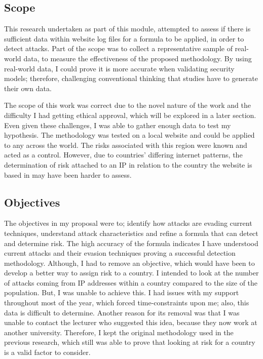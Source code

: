 \subsection{Scope}

This research undertaken as part of this module, attempted to assess if there is sufficient data within website log files for a formula to be applied, in order to detect attacks. Part of the scope was to collect a representative sample of real-world data, to measure the effectiveness of the proposed methodology. By using real-world data, I could prove it is more accurate when validating security models; therefore, challenging conventional thinking that studies have to generate their own data.

The scope of this work was correct due to the novel nature of the work and the difficulty I had getting ethical approval, which will be explored in a later section. Even given these challenges, I was able to gather enough data to test my hypothesis. The methodology was tested on a local website and could be applied to any across the world. The risks associated with this region were known and acted as a control. However, due to countries' differing internet patterns, the determination of risk attached to an IP in relation to the country the website is based in may have been harder to assess.



\subsection{Objectives}

The objectives in my proposal were to; identify how attacks are evading current techniques, understand attack characteristics and refine a formula that can detect and determine risk. The high accuracy of the formula indicates I have understood current attacks and their evasion techniques proving a successful detection methodology. Although, I had to remove an objective, which would have been to develop a better way to assign risk to a country. I intended to look at the number of attacks coming from IP addresses within a country compared to the size of the population. But, I was unable to achieve this. I had issues with my support throughout most of the year, which forced time-constraints upon me; also, this data is difficult to determine. Another reason for its removal was that I was unable to contact the lecturer who suggested this idea, because they now work at another university. Therefore, I kept the original methodology used in the previous research, which still was able to prove that looking at risk for a country is a valid factor to consider.

